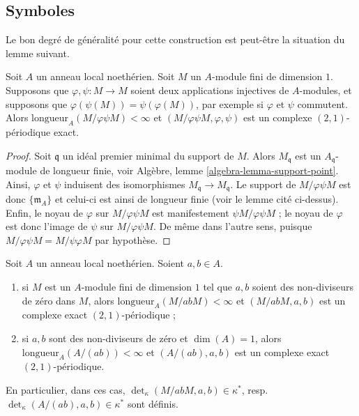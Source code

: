 







\subsection{Symboles}
\label{subsection-symbols}

\noindent
Le bon degré de généralité pour cette construction est peut-être la
situation du lemme suivant.

\begin{lemma}
\label{lemma-pre-symbol}
Soit $A$ un anneau local noethérien.
Soit $M$ un $A$-module fini de dimension $1$.
Supposons que $\varphi, \psi : M \to M$ soient deux applications injectives de
$A$-modules, et supposons que $\varphi(\psi(M)) = \psi(\varphi(M))$,
par exemple si $\varphi$ et $\psi$ commutent.
Alors $\text{longueur}_A(M/\varphi\psi M) < \infty$
et $(M/\varphi\psi M, \varphi, \psi)$ est un complexe
$(2, 1)$-périodique exact.
\end{lemma}

\begin{proof}
Soit $\mathfrak q$ un idéal premier minimal du support de $M$.
Alors $M_{\mathfrak q}$ est un $A_{\mathfrak q}$-module de longueur finie,
voir Algèbre, lemme \ref{algebra-lemma-support-point}.
Ainsi, $\varphi$ et $\psi$
induisent des isomorphismes $M_{\mathfrak q} \to M_{\mathfrak q}$.
Le support de $M/\varphi\psi M$ est donc $\{\mathfrak m_A\}$
et celui-ci est ainsi de longueur finie (voir le lemme cité ci-dessus).
Enfin, le noyau de $\varphi$ sur $M/\varphi\psi M$
est manifestement $\psi M/\varphi\psi M$ ; le noyau
de $\varphi$ est donc l'image de $\psi$ sur $M/\varphi\psi M$.
De même dans l'autre sens, puisque $M/\varphi\psi M = M/\psi\varphi M$
par hypothèse.
\end{proof}

\begin{lemma}
\label{lemma-symbol-defined}
Soit $A$ un anneau local noethérien. Soient $a, b \in A$.
\begin{enumerate}
\item si $M$ est un $A$-module fini de dimension $1$
tel que $a, b$ soient des non-diviseurs de zéro dans $M$, alors
$\text{longueur}_A(M/abM) < \infty$ et
$(M/abM, a, b)$ est un complexe exact $(2, 1)$-périodique ;
\item si $a, b$ sont des non-diviseurs de zéro et $\dim(A) = 1$,
alors $\text{longueur}_A(A/(ab)) < \infty$ et
$(A/(ab), a, b)$ est un complexe exact $(2, 1)$-périodique.
\end{enumerate}
En particulier, dans ces cas,
$\det_\kappa(M/abM, a, b) \in \kappa^*$,
resp.\ $\det_\kappa(A/(ab), a, b) \in \kappa^*$
sont définis.
\end{lemma}

